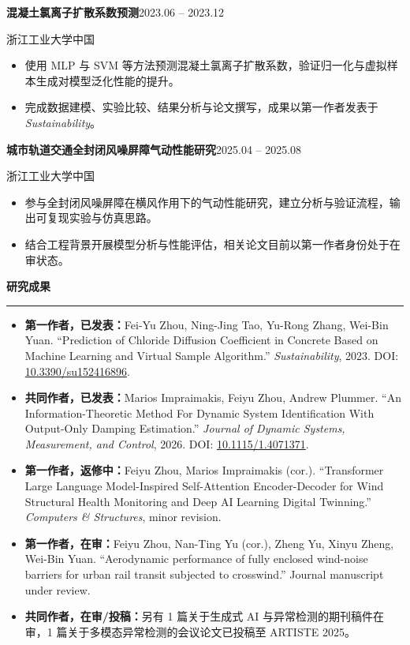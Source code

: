 \documentclass[UTF8,11pt,a4paper,fontset=fandol]{ctexart}
\newcommand{\CVSection}[1]{%
  \vspace{7pt}%
  {\large\bfseries #1}\par
  \vspace{4pt}\hrule\vspace{5pt}%
}
\newcommand{\EntryHeader}[4]{%
  {\bfseries #1}\hfill {#2}\par
  {\color{black!75}#3}\hfill {\color{black!75}#4}\par
}
\begin{document}
\vspace{3pt}
\EntryHeader{混凝土氯离子扩散系数预测}{2023.06 -- 2023.12}{浙江工业大学}{中国}
\begin{itemize}
  \item 使用 MLP 与 SVM 等方法预测混凝土氯离子扩散系数，验证归一化与虚拟样本生成对模型泛化性能的提升。
  \item 完成数据建模、实验比较、结果分析与论文撰写，成果以第一作者发表于 \emph{Sustainability}。
\end{itemize}

\vspace{3pt}
\EntryHeader{城市轨道交通全封闭风噪屏障气动性能研究}{2025.04 -- 2025.08}{浙江工业大学}{中国}
\begin{itemize}
  \item 参与全封闭风噪屏障在横风作用下的气动性能研究，建立分析与验证流程，输出可复现实验与仿真思路。
  \item 结合工程背景开展模型分析与性能评估，相关论文目前以第一作者身份处于在审状态。
\end{itemize}

\CVSection{研究成果}
\begin{itemize}
  \item \textbf{第一作者，已发表：}Fei-Yu Zhou, Ning-Jing Tao, Yu-Rong Zhang, Wei-Bin Yuan. ``Prediction of Chloride Diffusion Coefficient in Concrete Based on Machine Learning and Virtual Sample Algorithm.'' \emph{Sustainability}, 2023. DOI: \href{https://doi.org/10.3390/su152416896}{10.3390/su152416896}.
  \item \textbf{共同作者，已发表：}Marios Impraimakis, Feiyu Zhou, Andrew Plummer. ``An Information-Theoretic Method For Dynamic System Identification With Output-Only Damping Estimation.'' \emph{Journal of Dynamic Systems, Measurement, and Control}, 2026. DOI: \href{https://doi.org/10.1115/1.4071371}{10.1115/1.4071371}.
  \item \textbf{第一作者，返修中：}Feiyu Zhou, Marios Impraimakis (cor.). ``Transformer Large Language Model-Inspired Self-Attention Encoder-Decoder for Wind Structural Health Monitoring and Deep AI Learning Digital Twinning.'' \emph{Computers \& Structures}, minor revision.
  \item \textbf{第一作者，在审：}Feiyu Zhou, Nan-Ting Yu (cor.), Zheng Yu, Xinyu Zheng, Wei-Bin Yuan. ``Aerodynamic performance of fully enclosed wind-noise barriers for urban rail transit subjected to crosswind.'' Journal manuscript under review.
  \item \textbf{共同作者，在审/投稿：}另有 1 篇关于生成式 AI 与异常检测的期刊稿件在审，1 篇关于多模态异常检测的会议论文已投稿至 ARTISTE 2025。
\end{itemize}
\end{document}
